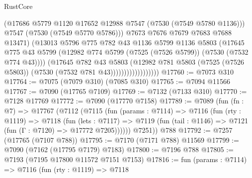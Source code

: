 \begin{lexlean}{RustCore}
\begin{coremodule}
                                  (@17686
                                    @5779
                                    @1120
                                    @17652
                                    @12988
                                    @7547
                                    (@7530 (@7549 @5780 @1136)))
                                  @7547
                                  (@7530 (@7549 @5770 @5786)))
                                @7673
                                @7676
                                @7679
                                @7683
                                @7688
                                @13471)
                              (@13013
                                @5796
                                @775
                                @782
                                @43
                                @1136
                                @5799
                                @1136
                                @5803
                                (@17645
                                  @775
                                  @43
                                  @5799
                                  (@12982
                                    @774
                                    @5799
                                    (@7525 (@7526 @5799))
                                    (@7530 (@7532 @774 @43))))
                                (@17645
                                  @782
                                  @43
                                  @5803
                                  (@12982
                                    @781
                                    @5803
                                    (@7525 (@7526 @5803))
                                    (@7530 (@7532 @781 @43))))))))))))))))))
@17760 := @7073 @310
@17764 := @7075 (@7079 @310) (@7085 @310)
@17765 := @7094 @11566
@17767 := @7090 (@17765 @7109)
@17769 := @7132 (@7133 @310)
@17770 := @7128 @17769
@17772 := @7090 (@17770 @7158)
@17789 := @7089
    (fun (fn : @7) =>
    @17767
      (@7112
        (@7115
          (fun (params : @7114) =>
          @7116
            (fun (rty : @1119) =>
            @7118
              (fun (lets : @7117) =>
              @7119 (fun (tail : @1146) => @7121 (fun (Γ : @7120) => @17772 @7205))))))
        @7251))
    @788
@17792 := @7257 (@17765 (@7107 @788))
@17795 := @7170 (@7171 @788) @11569
@17799 := @7090 (@7162 (@17795 @7179) @7183)
@17800 := @7196 @788
@17805 := @7193 (@7195 @17800 @11572 @7151 @7153)
@17816 := fun (params : @7114) =>
  @7116
    (fun (rty : @1119) =>
    @7118

\end{coremodule}
\end{lexlean}
